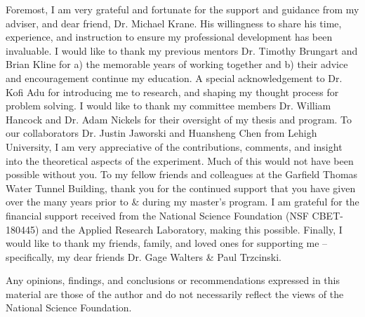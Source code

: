 Foremost, I am very grateful and fortunate for the support and guidance from my adviser, and dear friend, Dr. Michael Krane. His willingness to share his time, experience, and instruction to ensure my professional development has been invaluable. I would like to thank my previous mentors Dr. Timothy Brungart and Brian Kline for a) the memorable years of working together and b) their advice and encouragement continue my education. A special acknowledgement to Dr. Kofi Adu for introducing me to research, and shaping my thought process for problem solving. I would like to thank my committee members Dr. William Hancock and Dr. Adam Nickels for their oversight of my thesis and program. To our collaborators Dr. Justin Jaworski and Huansheng Chen from Lehigh University, I am very appreciative of the contributions, comments, and insight into the theoretical aspects of the experiment. Much of this would not have been possible without you. To my fellow friends and colleagues at the Garfield Thomas Water Tunnel Building, thank you for the continued support that you have given over the many years prior to \& during my master's program. I am grateful for the financial support received from the National Science Foundation (NSF CBET-180445) and the Applied Research Laboratory, making this possible. Finally, I would like to thank my friends, family, and loved ones for supporting me -- specifically, my dear friends Dr. Gage Walters \& Paul Trzcinski.

Any opinions, findings, and conclusions or recommendations expressed in this material are those of the author and do not necessarily reflect the views of the National Science Foundation.
